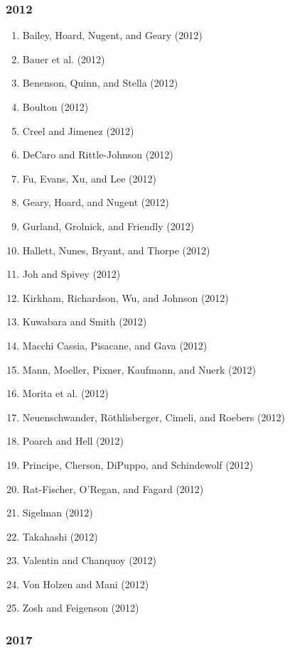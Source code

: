 \documentclass[english,man]{apa6}
\providecommand{\tightlist}{%
  \setlength{\itemsep}{0pt}\setlength{\parskip}{0pt}}
\theoremstyle{definition}
\theoremstyle{definition}
\theoremstyle{definition}
\theoremstyle{remark}
\begin{document}
\subsubsection{2012}\label{section-12}

\begin{enumerate}
\def\labelenumi{\arabic{enumi})}
\tightlist
\item
  Bailey, Hoard, Nugent, and Geary (2012)
\item
  Bauer et al. (2012)
\item
  Benenson, Quinn, and Stella (2012)
\item
  Boulton (2012)
\item
  Creel and Jimenez (2012)
\item
  DeCaro and Rittle-Johnson (2012)
\item
  Fu, Evans, Xu, and Lee (2012)
\item
  Geary, Hoard, and Nugent (2012)
\item
  Gurland, Grolnick, and Friendly (2012)
\item
  Hallett, Nunes, Bryant, and Thorpe (2012)
\item
  Joh and Spivey (2012)
\item
  Kirkham, Richardson, Wu, and Johnson (2012)
\item
  Kuwabara and Smith (2012)
\item
  Macchi Cassia, Pisacane, and Gava (2012)
\item
  Mann, Moeller, Pixner, Kaufmann, and Nuerk (2012)
\item
  Morita et al. (2012)
\item
  Neuenschwander, Röthlisberger, Cimeli, and Roebers (2012)
\item
  Poarch and Hell (2012)
\item
  Principe, Cherson, DiPuppo, and Schindewolf (2012)
\item
  Rat-Fischer, O'Regan, and Fagard (2012)
\item
  Sigelman (2012)
\item
  Takahashi (2012)
\item
  Valentin and Chanquoy (2012)
\item
  Von Holzen and Mani (2012)
\item
  Zosh and Feigenson (2012)
\end{enumerate}

\subsubsection{2017}\label{section-13}
\end{document}
